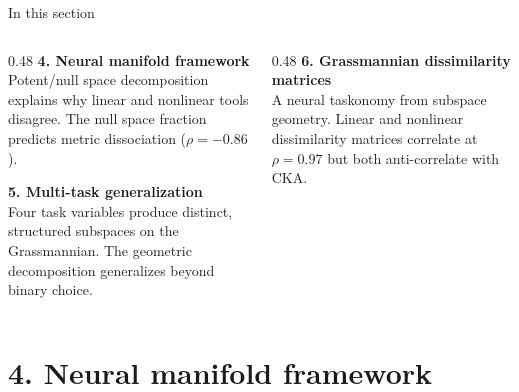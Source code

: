 \documentclass[aspectratio=169,11pt]{beamer}
\begin{document}
\begin{frame}[plain]
\vfill
\begin{center}
  \setlength{\fboxrule}{2.5pt}%
\end{center}
\vfill
\end{frame}

\begin{frame}{In this section}
\begin{columns}[T]
\begin{column}{0.48\textwidth}
\textbf{4. Neural manifold framework}\\[0.2em]
{\small Potent/null space decomposition explains why linear and nonlinear tools disagree. The null space fraction predicts metric dissociation ($\rho = -0.86$).}

\vspace{0.6em}
\textbf{5. Multi-task generalization}\\[0.2em]
{\small Four task variables produce distinct, structured subspaces on the Grassmannian. The geometric decomposition generalizes beyond binary choice.}
\end{column}
\begin{column}{0.48\textwidth}
\textbf{6. Grassmannian dissimilarity matrices}\\[0.2em]
{\small A neural taskonomy from subspace geometry. Linear and nonlinear dissimilarity matrices correlate at $\rho = 0.97$ but both anti-correlate with CKA.}
\end{column}
\end{columns}
\end{frame}

\section{4. Neural manifold framework}
\end{document}
